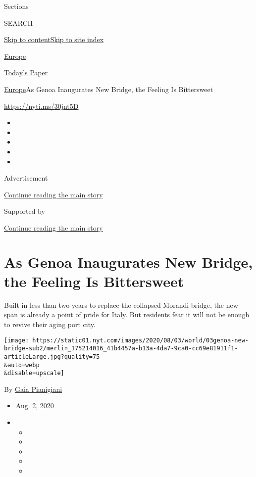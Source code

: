 Sections

SEARCH

\protect\hyperlink{site-content}{Skip to
content}\protect\hyperlink{site-index}{Skip to site index}

\href{https://www.nytimes.com/section/world/europe}{Europe}

\href{https://myaccount.nytimes.com/auth/login?response_type=cookie\&client_id=vi}{}

\href{https://www.nytimes.com/section/todayspaper}{Today's Paper}

\href{/section/world/europe}{Europe}\textbar{}As Genoa Inaugurates New
Bridge, the Feeling Is Bittersweet

\url{https://nyti.ms/30jnt5D}

\begin{itemize}
\item
\item
\item
\item
\item
\end{itemize}

Advertisement

\protect\hyperlink{after-top}{Continue reading the main story}

Supported by

\protect\hyperlink{after-sponsor}{Continue reading the main story}

\hypertarget{as-genoa-inaugurates-new-bridge-the-feeling-is-bittersweet}{%
\section{As Genoa Inaugurates New Bridge, the Feeling Is
Bittersweet}\label{as-genoa-inaugurates-new-bridge-the-feeling-is-bittersweet}}

Built in less than two years to replace the collapsed Morandi bridge,
the new span is already a point of pride for Italy. But residents fear
it will not be enough to revive their aging port city.

\texttt{[image: https://static01.nyt.com/images/2020/08/03/world/03genoa-new-bridge-sub2/merlin\_175214016\_41b4457a-b13a-4da7-9ca0-cc69e81911f1-articleLarge.jpg?quality=75\\\&auto=webp\\\&disable=upscale]}

By \href{https://www.nytimes.com/by/gaia-pianigiani}{Gaia Pianigiani}

\begin{itemize}
\item
  Aug. 2, 2020
\item
  \begin{itemize}
  \item
  \item
  \item
  \item
  \item
  \end{itemize}
\end{itemize}

